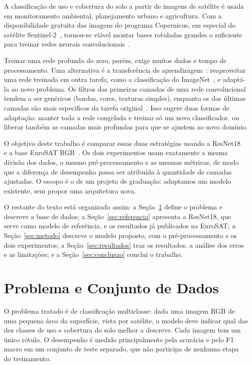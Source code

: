 \documentclass[conference,a4paper]{IEEEtran}
\begin{document}
A classificação de uso e cobertura do solo a partir de imagens de satélite é usada em monitoramento ambiental, planejamento urbano e agricultura. Com a disponibilidade gratuita das imagens do programa Copernicus, em especial do satélite Sentinel-2~\cite{drusch2012sentinel}, tornou-se viável montar bases rotuladas grandes o suficiente para treinar redes neurais convolucionais~\cite{cheng2017remote}.

Treinar uma rede profunda do zero, porém, exige muitos dados e tempo de processamento. Uma alternativa é a transferência de aprendizagem~\cite{pan2010survey}: reaproveitar uma rede treinada em outra tarefa, como a classificação do ImageNet~\cite{deng2009imagenet}, e adaptá-la ao novo problema. Os filtros das primeiras camadas de uma rede convolucional tendem a ser genéricos (bordas, cores, texturas simples), enquanto os das últimas camadas são mais específicos da tarefa original~\cite{yosinski2014transferable}. Isso sugere duas formas de adaptação: manter toda a rede congelada e treinar só um novo classificador, ou liberar também as camadas mais profundas para que se ajustem ao novo domínio.

O objetivo deste trabalho é comparar essas duas estratégias usando a ResNet18~\cite{he2016deep} e a base EuroSAT RGB~\cite{helber2019eurosat}. Os dois experimentos usam exatamente a mesma divisão dos dados, o mesmo pré-processamento e as mesmas métricas, de modo que a diferença de desempenho possa ser atribuída à quantidade de camadas ajustadas. O escopo é o de um projeto de graduação: adaptamos um modelo existente, sem propor uma arquitetura nova.

O restante do texto está organizado assim: a Seção~\ref{sec:base} define o problema e descreve a base de dados; a Seção~\ref{sec:referencia} apresenta a ResNet18, que serve como modelo de referência, e os resultados já publicados na EuroSAT; a Seção~\ref{sec:metodo} descreve o modelo proposto, com o pré-processamento e os dois experimentos; a Seção~\ref{sec:resultados} traz os resultados, a análise dos erros e as limitações; e a Seção~\ref{sec:conclusao} conclui o trabalho.

\section{Problema e Conjunto de Dados}
\label{sec:base}

O problema tratado é de classificação multiclasse: dada uma imagem RGB de uma pequena área da superfície, vista por satélite, o modelo deve indicar qual das dez classes de uso e cobertura do solo melhor a descreve. Cada imagem tem um único rótulo. O desempenho é medido principalmente pela acurácia e pelo F1 macro em um conjunto de teste separado, que não participa de nenhuma etapa do treinamento.
\end{document}
